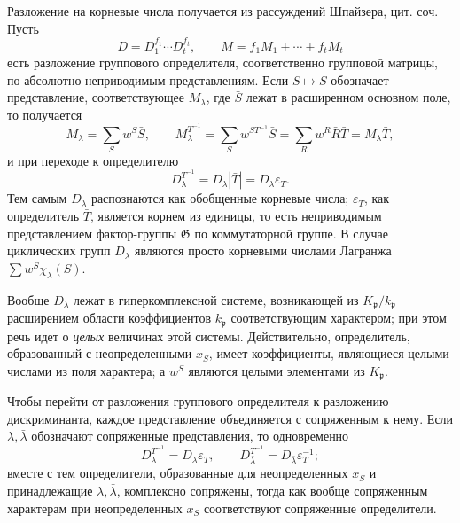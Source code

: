 \documentclass[11pt]{article}
\providecommand{\frakp}{\mathfrak{p}}
\providecommand{\Gg}{\mathfrak{G}}
\begin{document}
Разложение на корневые числа получается из рассуждений Шпайзера, цит. соч. Пусть
\[
        D=D_1^{f_1}\cdots D_t^{f_t},
        \qquad
        M=f_1M_1+\cdots+f_tM_t
\]
есть разложение группового определителя, соответственно групповой матрицы, по абсолютно неприводимым представлениям. Если \(S\mapsto\bar S\) обозначает представление, соответствующее \(M_\lambda\), где \(\bar S\) лежат в расширенном основном поле, то получается
\[
        M_\lambda=\sum_S w^S\bar S,
        \qquad
        M_\lambda^{T^{-1}}=\sum_S w^{ST^{-1}}\bar S
          =\sum_R w^R\bar R\bar T=M_\lambda\bar T,
\]
и при переходе к определителю
\[
        D_\lambda^{T^{-1}}=D_\lambda|\bar T|=D_\lambda\varepsilon_T.
\]
Тем самым \(D_\lambda\) распознаются как обобщенные корневые числа; \(\varepsilon_T\), как определитель \(\bar T\), является корнем из единицы, то есть неприводимым представлением фактор-группы \(\Gg\) по коммутаторной группе. В случае циклических групп \(D_\lambda\) являются просто корневыми числами Лагранжа \(\sum w^S\chi_\lambda(S)\).

Вообще \(D_\lambda\) лежат в гиперкомплексной системе, возникающей из \(K_\frakp/k_\frakp\) расширением области коэффициентов \(k_\frakp\) соответствующим характером; при этом речь идет о \emph{целых} величинах этой системы. Действительно, определитель, образованный с неопределенными \(x_S\), имеет коэффициенты, являющиеся целыми числами из поля характера; а \(w^S\) являются целыми элементами из \(K_\frakp\).

Чтобы перейти от разложения группового определителя к разложению дискриминанта, каждое представление объединяется с сопряженным к нему. Если \(\lambda,\bar\lambda\) обозначают сопряженные представления, то одновременно
\[
        D_\lambda^{T^{-1}}=D_\lambda\varepsilon_T,
        \qquad
        D_{\bar\lambda}^{T^{-1}}=D_{\bar\lambda}\varepsilon_T^{-1};
\]
вместе с тем определители, образованные для неопределенных \(x_S\) и принадлежащие \(\lambda,\bar\lambda\), комплексно сопряжены, тогда как вообще сопряженным характерам при неопределенных \(x_S\) соответствуют сопряженные определители.
\end{document}
